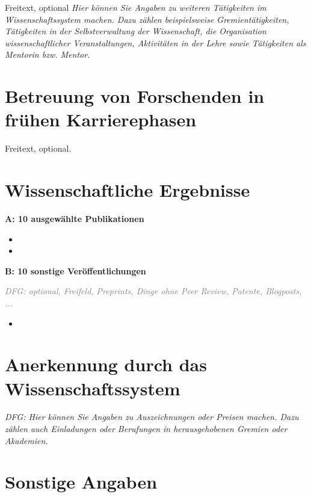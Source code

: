 \documentclass[a4paper,11pt]{article} %
\begin{document}
Freitext, optional
\emph{Hier können Sie Angaben zu weiteren Tätigkeiten im
Wissenschaftssystem machen. Dazu zählen beispielsweise
Gremientätigkeiten, Tätigkeiten in der Selbstverwaltung der
Wissenschaft, die Organisation wissenschaftlicher Veranstaltungen,
Aktivitäten in der Lehre sowie Tätigkeiten als Mentorin
bzw. Mentor.}

\section*{Betreuung von Forschenden in frühen Karrierephasen}%

Freitext, optional.

\section*{Wissenschaftliche Ergebnisse}

\textbf{A: 10 ausgewählte Publikationen}

\medskip

\begin{itemize}
\item {}
\item {}
\end{itemize}

\medskip 

\textbf{B: 10 sonstige Veröffentlichungen}

\textcolor{gray}{\emph{DFG: optional, Freifeld, Preprints, Dinge ohne Peer Review, Patente, Blogposts, ...}}

\begin{itemize}
\item {}
\end{itemize}

\section*{Anerkennung durch das Wissenschaftssystem}

\emph{DFG: Hier können Sie Angaben zu Auszeichnungen oder Preisen
machen. Dazu zählen auch Einladungen oder Berufungen in
herausgehobenen Gremien oder Akademien.  }

\section*{Sonstige Angaben}
\end{document}
